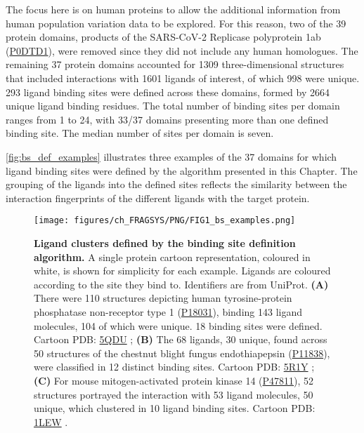 The focus here is on human proteins to allow the additional information from human population variation data to be explored. For this reason, two of the 39 protein domains, products of the SARS-CoV-2 Replicase polyprotein 1ab (\href{https://www.uniprot.org/uniprotkb/P0DTD1/entry}{P0DTD1}), were removed since they did not include any human homologues. The remaining 37 protein domains accounted for 1309 three-dimensional structures that included interactions with 1601 ligands of interest, of which 998 were unique. 293 ligand binding sites were defined across these domains, formed by 2664 unique ligand binding residues. The total number of binding sites per domain ranges from 1 to 24, with 33/37 domains presenting more than one defined binding site. The median number of sites per domain is seven.

\autoref{fig:bs_def_examples} illustrates three examples of the 37 domains for which ligand binding sites were defined by the algorithm presented in this Chapter. The grouping of the ligands into the defined sites reflects the similarity between the interaction fingerprints of the different ligands with the target protein.

\begin{figure}[htb!]
    \centering
    \texttt{[image: figures/ch\_FRAGSYS/PNG/FIG1\_bs\_examples.png]}
    \caption[Ligand clusters defined by the binding site definition algorithm]{\textbf{Ligand clusters defined by the binding site definition algorithm.} A single protein cartoon representation, coloured in white, is shown for simplicity for each example. Ligands are coloured according to the site they bind to. Identifiers are from UniProt. \textbf{(A)} There were 110 structures depicting human tyrosine-protein phosphatase non-receptor type 1 (\href{https://www.uniprot.org/uniprotkb/P18031/entry}{P18031}), binding 143 ligand molecules, 104 of which were unique. 18 binding sites were defined. Cartoon PDB: \href{https://www.ebi.ac.uk/pdbe/entry/pdb/5qdu}{5QDU} \cite{KEEDY_2018_PTP1B}; \textbf{(B)} The 68 ligands, 30 unique, found across 50 structures of the chestnut blight fungus endothiapepsin (\href{https://www.uniprot.org/uniprotkb/P11838/entry}{P11838}), were classified in 12 distinct binding sites. Cartoon PDB: \href{https://www.ebi.ac.uk/pdbe/entry/pdb/5r1y}{5R1Y} \cite{WOLLENHAUPT_2020_F2X}; \textbf{(C)} For mouse mitogen-activated protein kinase 14 (\href{https://www.uniprot.org/uniprotkb/P47811/entry}{P47811}), 52 structures portrayed the interaction with 53 ligand molecules, 50 unique, which clustered in 10 ligand binding sites. Cartoon PDB: \href{https://www.ebi.ac.uk/pdbe/entry/pdb/1lew}{1LEW} \cite{CHANG_2002_MapKinase}.}
    \label{fig:bs_def_examples}
\end{figure}

